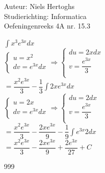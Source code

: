 \documentclass[a4paper]{article}
\begin{document}
  
\noindent \large Auteur: Niels Hertoghs \\
\noindent \large Studierichting: Informatica\\
\noindent \large Oefeningenreeks 4A nr. 15.3\\

\medskip

\normalsize

$\displaystyle\int x^3 e^{3x}dx$ \\

$\left\{
\begin{array}{l}
	u = x^2 \\
	dv = e^{3x} dx \\
\end{array}
\right . 
\Rightarrow \left\{
\begin{array}{l}
	du = 2x dx\\
	v = \dfrac{e^{3x}}{3}\\
\end{array}
\right . $ \\

$= \dfrac{x^2 e^{3x}}{3} - \dfrac{1}{3} \displaystyle\int 2x e^{3x} dx$ \\

$\left\{
\begin{array}{l}
	u = 2x \\
	dv = e^{3x} dx\\
\end{array}
\right . 
\Rightarrow \left\{
\begin{array}{l}
	du = 2 dx\\
	v = \dfrac{e^{3x}}{3}\\
\end{array}
\right . $ \\

$= \dfrac{x^2 e^{3x}}{3} - \dfrac{2xe^{3x}}{9} - \dfrac{1}{9} \displaystyle\int e^{3x}2 dx$ \\

$= \dfrac{x^2 e^{3x}}{3} - \dfrac{2xe^{3x}}{9} + \dfrac{2e^{3x}}{27} + C$ \\

\begin{thebibliography}{999}
\end{thebibliography}
\end{document}
